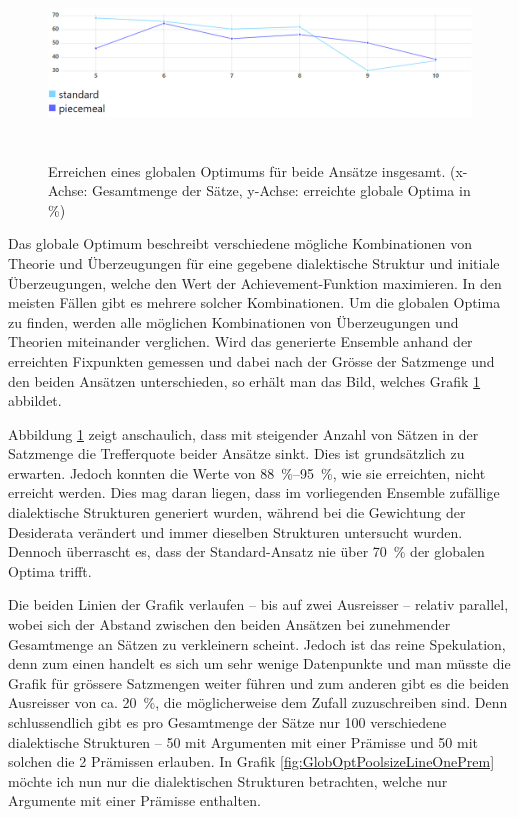 \documentclass{article}
\begin{document}
\begin{figure}[ht]
  \centering
  \includegraphics[width=\textwidth,height=5cm,keepaspectratio]{images/global_optima_standard_piecemeal.png}
  \caption{Erreichen eines globalen Optimums für beide Ansätze insgesamt. (x-Achse: Gesamtmenge der Sätze, y-Achse: erreichte globale Optima in \%) \label{fig:GlobOptPoolsizeLine}}
\end{figure}

Das globale Optimum beschreibt verschiedene mögliche Kombinationen von Theorie und Überzeugungen für eine gegebene dialektische Struktur und initiale Überzeugungen, welche den Wert der Achievement-Funktion maximieren. In den meisten Fällen gibt es mehrere solcher Kombinationen. Um die globalen Optima zu finden, werden alle möglichen Kombinationen von Überzeugungen und Theorien miteinander verglichen. Wird das generierte Ensemble anhand der erreichten Fixpunkten gemessen und dabei nach der Grösse der Satzmenge und den beiden Ansätzen unterschieden, so erhält man das Bild, welches Grafik \ref{fig:GlobOptPoolsizeLine} abbildet.

Abbildung \ref{fig:GlobOptPoolsizeLine} zeigt anschaulich, dass mit steigender Anzahl von Sätzen in der Satzmenge die Trefferquote beider Ansätze sinkt. Dies ist grundsätzlich zu erwarten. Jedoch konnten die Werte von 88~\%--95~\%, wie sie \cite[S.~455]{beisbart_making_2021} erreichten, nicht erreicht werden. Dies mag daran liegen, dass im vorliegenden Ensemble zufällige dialektische Strukturen generiert wurden, während bei \cite{beisbart_making_2021} die Gewichtung der Desiderata verändert und immer dieselben Strukturen untersucht wurden. Dennoch überrascht es, dass der Standard-Ansatz nie über 70~\% der globalen Optima trifft.

Die beiden Linien der Grafik verlaufen -- bis auf zwei Ausreisser -- relativ parallel, wobei sich der Abstand zwischen den beiden Ansätzen bei zunehmender Gesamtmenge an Sätzen zu verkleinern scheint. Jedoch ist das reine Spekulation, denn zum einen handelt es sich um sehr wenige Datenpunkte und man müsste die Grafik für grössere Satzmengen weiter führen und zum anderen gibt es die beiden Ausreisser von ca. 20~\%, die möglicherweise dem Zufall zuzuschreiben sind. Denn schlussendlich gibt es pro Gesamtmenge der Sätze nur 100 verschiedene dialektische Strukturen -- 50 mit Argumenten mit einer Prämisse und 50 mit solchen die 2 Prämissen erlauben. In Grafik \ref{fig:GlobOptPoolsizeLineOnePrem} möchte ich nun nur die dialektischen Strukturen betrachten, welche nur Argumente mit einer Prämisse enthalten.
\end{document}

